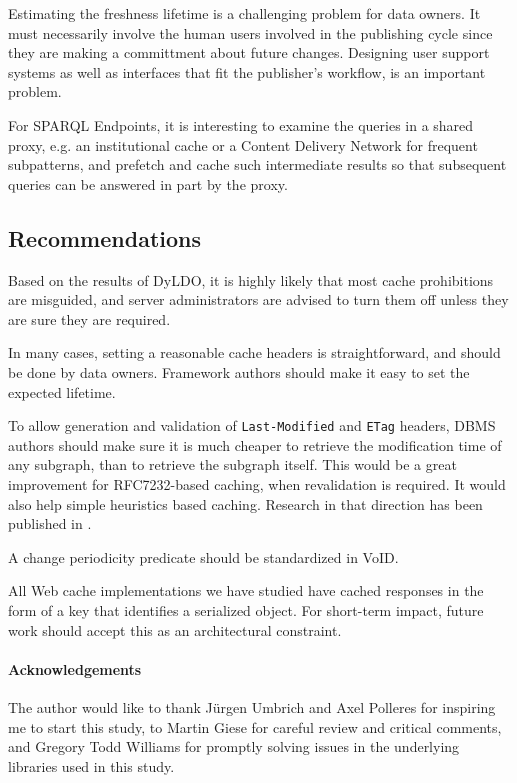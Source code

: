 \documentclass{llncs}
\newcommand{\httph}[1]{\texttt{#1}}
\begin{document}
Estimating the freshness lifetime is a challenging problem for data
owners. It must necessarily involve the human users involved in the
publishing cycle since they are making a committment about future
changes. Designing user support systems as well as interfaces that fit
the publisher's workflow, is an important problem.

For SPARQL Endpoints, it is interesting to examine the queries in a
shared proxy, e.g. an institutional cache or a Content
Delivery Network for frequent subpatterns, and prefetch and cache such
intermediate results so that subsequent queries can be answered in
part by the proxy.


\subsection{Recommendations}

Based on the results of DyLDO, it is highly likely that most cache
prohibitions are misguided, and server administrators are advised to
turn them off unless they are sure they are required.

In many cases, setting a reasonable cache headers is straightforward,
and should be done by data owners. Framework authors should make it
easy to set the expected lifetime.

To allow generation and validation of \httph{Last-Modified} and
\httph{ETag} headers, DBMS authors should make sure it is much cheaper
to retrieve the modification time of any subgraph, than to retrieve
the subgraph itself. This would be a great improvement for
RFC7232-based caching, when revalidation is required. It would also
help simple heuristics based caching. Research in that direction has
been published in \cite{kaseicache}.

A change periodicity predicate should be standardized in VoID.

All Web cache implementations we have studied have cached responses in
the form of a key that identifies a serialized object. For short-term
impact, future work should accept this as an architectural constraint.

\paragraph*{Acknowledgements} The author would like to thank Jürgen
Umbrich and Axel Polleres for inspiring me to start this study, to
Martin Giese for careful review and critical comments, and Gregory
Todd Williams for promptly solving issues in the underlying libraries
used in this study.
\end{document}
